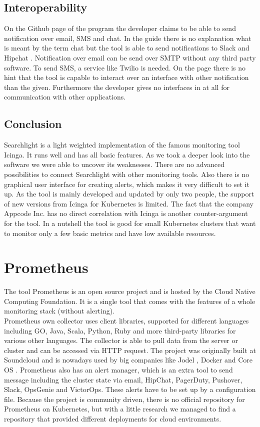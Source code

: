 \subsection{Interoperability}
On the Github page \cite{searchlight} of the program the developer claims to be able to send notification over email, SMS and chat.
In the guide there is no explanation what is meant by the term chat but the tool is able to send notifications to Slack \cite{slack} and Hipchat \cite{hipchat}. Notification over email can be send over SMTP without any third party software. To send SMS, a service like Twilio \cite{twilio} is needed.
On the page there is no hint that the tool is capable to interact over an interface with other notification than the given. Furthermore the developer gives no interfaces in at all for communication with other applications.
\subsection{Conclusion}
Searchlight is a light weighted  implementation of the famous monitoring tool Icinga. It runs well and has all basic features. As we took a deeper look into the software we were able to uncover its weaknesses. There are no advanced possibilities to connect Searchlight with other monitoring tools. Also there is no graphical user interface for creating alerts, which makes it very difficult to set it up. As the tool is mainly developed and updated by only two people, the support of new versions from Icinga for Kubernetes is limited. The fact that the company Appcode Inc. has no direct correlation with Icinga is another counter-argument for the tool. In a nutshell the tool is good for small Kubernetes clusters that want to monitor only a few basic metrics and have low available resources. 

\section{Prometheus}
\label{Prometheus} %
The tool Prometheus is an open source project and is hosted by the Cloud Native Computing Foundation.
It is a single tool that comes with the features of a whole monitoring stack (without alerting).\\ Prometheus own collector uses client libraries, supported for different languages including GO, Java, Scala, Python, Ruby and more third-party libraries for various other languages. The collector is able to pull data from the server or cluster and can be accessed via HTTP request.
The project was originally built at Soundcloud \cite{soundcloud} and  is nowadays used by big companies like Jodel \cite{jodel}, Docker and Core OS \cite{prometeus}.
Prometheus also has an alert manager, which is an extra tool to send message including the cluster state via email, HipChat, PagerDuty, Pushover, Slack, OpsGenie and VictorOps. These alerts have to be set up by a configuration file. 
Because the project is community driven, there is no official repository for Prometheus on Kubernetes, but with a little research we managed to find a repository \cite{prometheus_kube} that provided different deployments for cloud environments.

